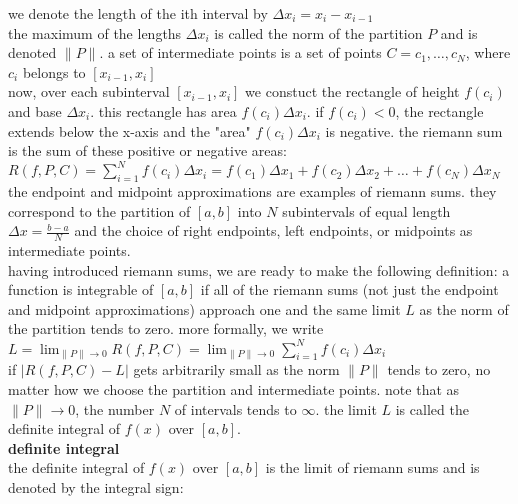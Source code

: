 \documentclass{article}
\begin{document}
we denote the length of the ith interval by $\Delta x_i =  x_i - x_{i-1}$\\

the maximum of the lengths $\Delta x_i$ is called the norm of the partition $P$ and is denoted $\lVert P\rVert$. a set of intermediate points is a set of points $C = {c_1, \ldots, c_N}$, where $c_i$ belongs to $[x_{i-1}, x_i]$\\

now, over each subinterval $[x_{i-1}, x_i]$ we constuct the rectangle of height $f(c_i)$ and base $\Delta x_i$. this rectangle has area $f(c_i)\Delta x_i$. if $f(c_i) < 0$, the rectangle extends below the x-axis and the "area" $f(c_i)\Delta x_i$ is negative. the riemann sum is the sum of these positive or negative areas:\\

$R(f, P, C) = \sum_{i=1}^{N}f(c_i)\Delta x_i = f(c_1)\Delta x_1 + f(c_2)\Delta x_2 + \ldots + f(c_N)\Delta x_N$\\

the endpoint and midpoint approximations are examples of riemann sums. they correspond to the partition of $[a, b]$ into $N$ subintervals of equal length $\Delta x = \frac{b - a}{N}$ and the choice of right endpoints, left endpoints, or midpoints as intermediate points.\\

having introduced riemann sums, we are ready to make the following definition: a function is integrable of $[a, b]$ if all of the riemann sums (not just the endpoint and midpoint approximations) approach one and the same limit $L$ as the norm of the partition tends to zero. more formally, we write\\

$L = \lim_{\lVert P\rVert \to 0}R(f, P, C) = \lim_{\lVert P\rVert \to 0}\sum_{i=1}^{N}f(c_i)\Delta x_i$\\

if $\lvert R(f, P, C) - L\rvert$ gets arbitrarily small as the norm $\lVert P\rVert$ tends to zero, no matter how we choose the partition and intermediate points. note that as $\lVert P\rVert \to 0$, the number $N$ of intervals tends to $\infty$. the limit $L$ is called the definite integral of $f(x)$ over $[a, b]$.\\

\textbf{definite integral}\\
the definite integral of $f(x)$ over $[a, b]$ is the limit of riemann sums and is denoted by the integral sign:\\
\end{document}

